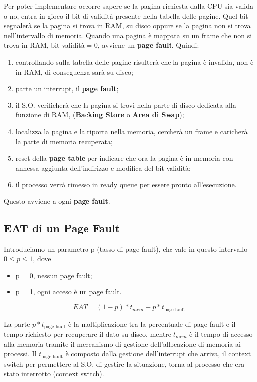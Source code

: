 \documentclass[a4paper, 12pt]{book}
\begin{document}
Per poter implementare occorre sapere se la pagina richiesta dalla CPU sia valida o no, entra in gioco il bit di validità presente
nella tabella delle pagine. Quel bit segnalerà se la pagina si trova in RAM, su disco oppure se la pagina non si trova 
nell'intervallo di memoria. Quando una pagina è mappata su un frame che non si trova in RAM, bit validità = 0, avviene un \textbf{page fault}.
Quindi:

\begin{enumerate}
    \item controllando sulla tabella delle pagine risulterà che la pagina è invalida, non è in RAM, di conseguenza sarà su disco;
    \item parte un interrupt, il \textbf{page fault};
    \item il S.O. verificherà che la pagina si trovi nella parte di disco dedicata alla funzione di RAM, (\textbf{Backing Store} o \textbf{Area di Swap});
    \item localizza la pagina e la riporta nella memoria, cercherà un frame e caricherà la parte di memoria recuperata;
    \item reset della \textbf{page table} per indicare che ora la pagina è in memoria con annessa aggiunta dell'indirizzo e modifica del bit validità;
    \item il processo verrà rimesso in ready queue per essere pronto all'esecuzione.
\end{enumerate}

Questo avviene a ogni \textbf{page fault}. 

\subsection{EAT di un Page Fault}

Introduciamo un parametro p (tasso di page fault), che vale in questo intervallo $0 \le p \le 1$, dove 

\begin{itemize}
    \item p = 0, nessun page fault;
    \item p = 1, ogni acceso è un page fault.
\end{itemize}

\[
    EAT = (1 - p) * t_{mem} + p * t_{\textrm{page fault}}
\]

La parte $p * t_{\textrm{page fault}}$ è la moltiplicazione tra la percentuale di page fault e il tempo richiesto per recuperare il 
dato su disco, mentre $t_{mem}$ è il tempo di accesso alla memoria tramite il meccanismo di gestione dell'allocazione di 
memoria ai processi. Il $t_{\textrm{page fault}}$ è composto dalla gestione dell'interrupt che arriva, il context switch per 
permettere al S.O. di gestire la situazione, torna al processo che era stato interrotto (context switch).
\end{document}
